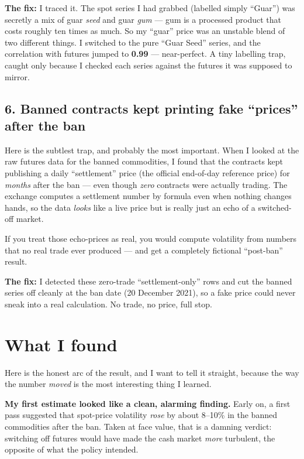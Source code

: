 \documentclass[11pt]{article}
\begin{document}
\textbf{The fix:} I traced it. The spot series I had grabbed (labelled simply ``Guar'') was secretly a mix of guar \emph{seed} and guar \emph{gum} --- gum is a processed product that costs roughly ten times as much. So my ``guar'' price was an unstable blend of two different things. I switched to the pure ``Guar Seed'' series, and the correlation with futures jumped to \textbf{0.99} --- near-perfect. A tiny labelling trap, caught only because I checked each series against the futures it was supposed to mirror.

\subsection*{6. Banned contracts kept printing fake ``prices'' after the ban}

Here is the subtlest trap, and probably the most important. When I looked at the raw futures data for the banned commodities, I found that the contracts kept publishing a daily ``settlement'' price (the official end-of-day reference price) for \emph{months} after the ban --- even though \emph{zero} contracts were actually trading. The exchange computes a settlement number by formula even when nothing changes hands, so the data \emph{looks} like a live price but is really just an echo of a switched-off market.

If you treat those echo-prices as real, you would compute volatility from numbers that no real trade ever produced --- and get a completely fictional ``post-ban'' result.

\textbf{The fix:} I detected these zero-trade ``settlement-only'' rows and cut the banned series off cleanly at the ban date (20 December 2021), so a fake price could never sneak into a real calculation. No trade, no price, full stop.

\section*{What I found}

Here is the honest arc of the result, and I want to tell it straight, because the way the number \emph{moved} is the most interesting thing I learned.

\textbf{My first estimate looked like a clean, alarming finding.} Early on, a first pass suggested that spot-price volatility \emph{rose} by about 8--10\% in the banned commodities after the ban. Taken at face value, that is a damning verdict: switching off futures would have made the cash market \emph{more} turbulent, the opposite of what the policy intended.
\end{document}
